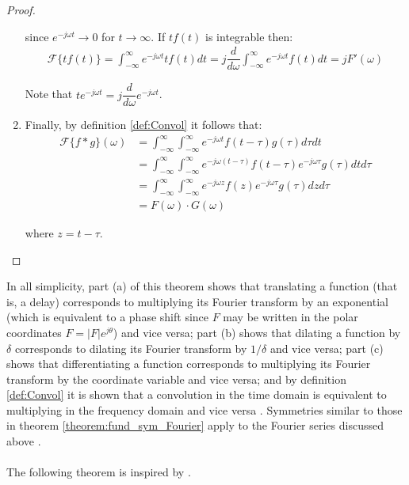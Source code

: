 \begin{proof}
\begin{enumerate}[label=(\alph*)]
since $e^{-j\omega t} \to 0$ for $t \to \infty$. If $tf(t)$ is integrable then:
\begin{align*}
\mathcal{F}\{tf(t)\} = \int_{-\infty}^\infty e^{-j \omega t} t f(t) dt = j \dfrac{d}{d\omega} \int_{-\infty}^\infty e^{-j \omega t} f(t) dt = j F'(\omega)
\end{align*}

Note that $t e^{-j \omega t} = j \dfrac{d}{d\omega} e^{-j\omega t}$.

\item Finally, by definition \ref{def:Convol} it follows that:
\begin{align*}
\mathcal{F}\{f*g\}(\omega) &= \int_{-\infty}^\infty \int_{-\infty}^\infty e^{-j \omega t} f(t - \tau) g(\tau) d\tau dt \\
&= \int_{-\infty}^\infty \int_{-\infty}^\infty e^{-j\omega(t-\tau)} f(t-\tau) e^{-j\omega \tau} g(\tau) dt d\tau \\
&= \int_{-\infty}^\infty \int_{-\infty}^\infty e^{-j\omega z} f(z) e^{-j\omega \tau} g(\tau) dz d\tau \\
&= F(\omega) \cdot G(\omega)
\end{align*}

where $z = t - \tau$.
\end{enumerate}
\end{proof}

\noindent
In all simplicity, part (a) of this theorem shows that translating a function (that is, a delay) corresponds to multiplying its Fourier transform by an exponential (which is equivalent to a phase shift since $F$ may be written in the polar coordinates $F = |F|e^{j\theta}$) and vice versa; part (b) shows that dilating a function by $\delta$ corresponds to dilating its Fourier transform by $1/\delta$ and vice versa; part (c) shows that differentiating a function corresponds to multiplying its Fourier transform by the coordinate variable and vice versa; and by definition \ref{def:Convol} it is shown that a convolution in the time domain is equivalent to multiplying in the frequency domain and vice versa \cite{page 215, FAA}. Symmetries similar to those in theorem \ref{theorem:fund_sym_Fourier} apply to the Fourier series discussed above \cite{page 60, DTSP}.
\\ \\
The following theorem is inspired by \cite{page 77, FAA}. 

